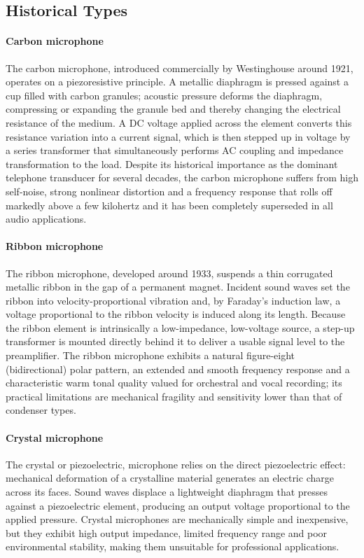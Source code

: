 \subsection{Historical Types}

\paragraph{Carbon microphone} The carbon microphone, introduced commercially by Westinghouse around 1921, operates on a piezoresistive principle.
A metallic diaphragm is pressed against a cup filled with carbon granules; acoustic pressure deforms the diaphragm, compressing or expanding the granule bed and thereby changing the electrical resistance of the medium.
A DC voltage applied across the element converts this resistance variation into a current signal, which is then stepped up in voltage by a series transformer that simultaneously performs AC coupling and impedance transformation to the load.
Despite its historical importance as the dominant telephone transducer for several decades, the carbon microphone suffers from high self-noise, strong nonlinear distortion and a frequency response that rolls off markedly above a few kilohertz and it has been completely superseded in all audio applications.

\paragraph{Ribbon microphone} The ribbon microphone, developed around 1933, suspends a thin corrugated metallic ribbon in the gap of a permanent magnet.
Incident sound waves set the ribbon into velocity-proportional vibration and, by Faraday's induction law, a voltage proportional to the ribbon velocity is induced along its length.
Because the ribbon element is intrinsically a low-impedance, low-voltage source, a step-up transformer is mounted directly behind it to deliver a usable signal level to the preamplifier.
The ribbon microphone exhibits a natural figure-eight (bidirectional) polar pattern, an extended and smooth frequency response and a characteristic warm tonal quality valued for orchestral and vocal recording; its practical limitations are mechanical fragility and sensitivity lower than that of condenser types.

\paragraph{Crystal microphone} The crystal or piezoelectric, microphone relies on the direct piezoelectric effect: mechanical deformation of a crystalline material generates an electric charge across its faces.
Sound waves displace a lightweight diaphragm that presses against a piezoelectric element, producing an output voltage proportional to the applied pressure.
Crystal microphones are mechanically simple and inexpensive, but they exhibit high output impedance, limited frequency range and poor environmental stability, making them unsuitable for professional applications.

